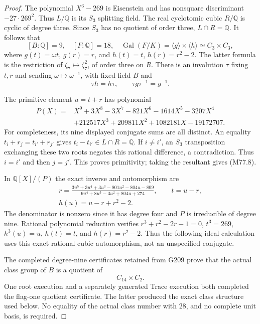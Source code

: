 \begin{proof}
The polynomial $X^3-269$ is Eisenstein and has nonsquare
discriminant $-27\cdot269^2$. Thus $L/\mathbb Q$ is its
$S_3$ splitting field. The real cyclotomic cubic $R/\mathbb Q$
is cyclic of degree three. Since $S_3$ has no quotient of
order three, $L\cap R=\mathbb Q$. It follows that
\[
 [B:\mathbb Q]=9,\quad [F:\mathbb Q]=18,\quad
 \operatorname{Gal}(F/K)=\langle g\rangle\times\langle h\rangle
                                      \simeq C_3\times C_3,
 \tag{M77.6}
\]
where $g(t)=\omega t$, $g(r)=r$, and
$h(t)=t$, $h(r)=r^2-2$. The latter formula is the restriction
of $\zeta_7\mapsto\zeta_7^2$, of order three on $R$.
There is an involution $\tau$ fixing $t,r$ and sending
$\omega\mapsto\omega^{-1}$, with fixed field $B$ and
\[
           \tau h=h\tau,\qquad \tau g\tau^{-1}=g^{-1}.
 \tag{M77.7}
\]

The primitive element $u=t+r$ has polynomial
\[
 \begin{aligned}
 P(X)={}&X^9+3X^8-3X^7-821X^6-1614X^5-3207X^4\\
        &+212517X^3+209811X^2+1082181X-19172707.
 \end{aligned}\tag{M77.8}
\]
For completeness, its nine displayed conjugate sums are
all distinct. An equality $t_i+r_j=t_{i'}+r_{j'}$ gives
$t_i-t_{i'}\in L\cap R=\mathbb Q$.
If $i\ne i'$, an $S_3$ transposition exchanging these two
roots negates this rational difference, a contradiction.
Thus $i=i'$ and then $j=j'$. This proves primitivity;
taking the resultant gives (M77.8).

In $\mathbb Q[X]/(P)$ the exact inverse and automorphism are
\[
 \begin{gathered}
 r=\frac{3u^5+3u^4+3u^3-801u^2-804u-809}
          {6u^4+8u^3-3u^2+804u+274},\qquad t=u-r,\\
                         h(u)=u-r+r^2-2.
 \end{gathered}\tag{M77.9}
\]
The denominator is nonzero since it has degree four and
$P$ is irreducible of degree nine. Rational polynomial
reduction verifies $r^3+r^2-2r-1=0$, $t^3=269$,
$h^3(u)=u$, $h(t)=t$, and $h(r)=r^2-2$.
Thus the following ideal calculation uses this exact
rational cubic automorphism, not an unspecified conjugate.

The completed degree-nine certificates retained from G209
prove that the actual class group of $B$ is a quotient of
\[
                             C_{14}\times C_2.
 \tag{M77.10}
\]
One root execution and a separately generated Trace
execution both completed the flag-one quotient certificate.
The latter produced the exact class structure used below.
No equality of the actual class number with $28$, and no
complete unit basis, is required.


\end{proof}

